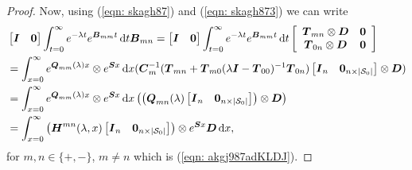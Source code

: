 \begin{proof}
Now, using (\ref{eqn: skagh87}) and (\ref{eqn: skagh873}) we can write 
\begin{align}
	\nonumber&\begin{bmatrix} \boldsymbol I & \boldsymbol 0  \end{bmatrix}\int_{t=0}^\infty e^{-\lambda t} e^{\boldsymbol{B}_{mm}t} \, \mathrm{d} t \boldsymbol{B}_{m{n}} = \begin{bmatrix} \boldsymbol I & \boldsymbol 0  \end{bmatrix}\int_{t=0}^\infty e^{-\lambda t} e^{\boldsymbol{B}_{mm}t} \, \mathrm{d} t  \left[\begin{array}{cc} \boldsymbol{T}_{mn}\otimes \boldsymbol{D} & \boldsymbol 0 \\ \boldsymbol T_{0n}\otimes \boldsymbol D & \boldsymbol 0 \end{array}\right]
	\\&= \int_{x=0}^\infty e^{\boldsymbol Q_{mm}(\lambda)x}\otimes  e^{\boldsymbol S x}\, \mathrm{d} x (\boldsymbol C_m^{-1}(\boldsymbol{T}_{mn} + \boldsymbol T_{m0}(\lambda \boldsymbol I - \boldsymbol T_{00})^{-1}\boldsymbol T_{0n}) \begin{bmatrix} \boldsymbol I_n & \boldsymbol 0_{n\times |\mathcal{S}_0|} \end{bmatrix} \otimes \boldsymbol D) \nonumber
	\\&= \int_{x=0}^\infty e^{\boldsymbol Q_{mm}(\lambda)x}\otimes  e^{\boldsymbol S x}\, \mathrm{d} x \left( \left( \boldsymbol{Q}_{mn} (\lambda) \begin{bmatrix} \boldsymbol I_n & \boldsymbol 0_{n\times |\mathcal{S}_0|} \end{bmatrix} \right) \otimes \boldsymbol D\right)  \nonumber
	\\&= \int_{x=0}^\infty \left(\boldsymbol H^{mn}(\lambda,x) \begin{bmatrix} \boldsymbol I_n & \boldsymbol 0_{n\times |\mathcal{S}_0|} \end{bmatrix}\right) \otimes  e^{\boldsymbol S x}\boldsymbol D\, \mathrm{d} x, \label{eqn: akgj987ad}
\end{align}
for \(m,n\in\{+,-\}\), \(m\neq n\) which is (\ref{eqn: akgj987adKLDJ}). 
\end{proof}